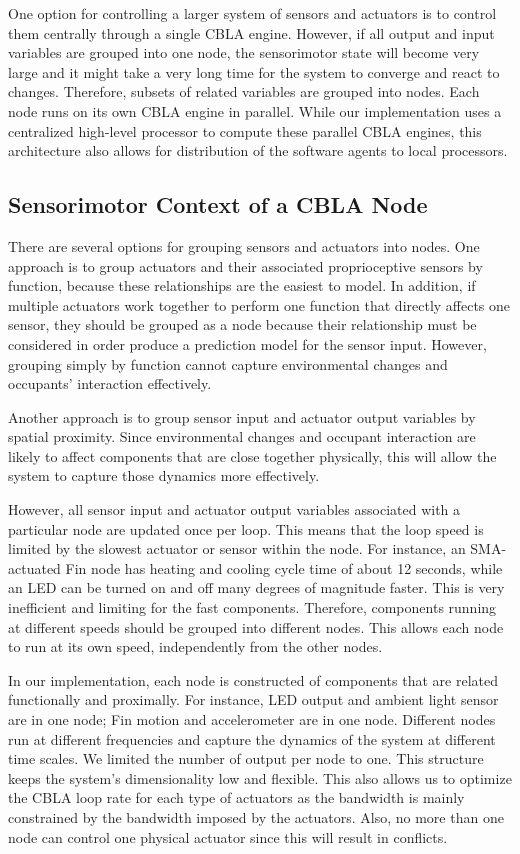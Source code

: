 One option for controlling a larger system of sensors and actuators is to control them centrally through a single CBLA engine.  However, if all output and input variables are grouped into one node, the sensorimotor state will become very large and it might take a very long time for the system to converge and react to changes. Therefore, subsets of related variables are grouped into nodes. Each node runs on its own CBLA engine in parallel.  While our implementation uses a centralized high-level processor to compute these parallel CBLA engines, this architecture also allows for distribution of the software agents to local processors.

\subsection{Sensorimotor Context of a CBLA Node}

There are several options for grouping sensors and actuators into nodes.  One approach is to group actuators and their associated proprioceptive sensors by function, because these relationships are the easiest to model. In addition, if multiple actuators work together to perform one function that directly affects one sensor, they should be grouped as a node because their relationship must be considered in order produce a prediction model for the sensor input. However, grouping simply by function cannot capture environmental changes and occupants' interaction effectively. 

Another approach is to group sensor input and actuator output variables by spatial proximity. Since environmental changes and occupant interaction are likely to affect components that are close together physically, this will allow the system to capture those dynamics more effectively. 

However, all sensor input and actuator output variables associated with a particular node are updated once per loop. This means that the loop speed is limited by the slowest actuator or sensor within the node. For instance, an SMA-actuated Fin node has heating and cooling cycle time of about 12 seconds, while an LED can be turned on and off many degrees of magnitude faster. This is very inefficient and limiting for the fast components. Therefore, components running at different speeds should be grouped into different nodes. This allows each node to run at its own speed, independently from the other nodes. 

In our implementation, each node is constructed of components that are related functionally and proximally. For instance, LED output and ambient light sensor are in one node; Fin motion and accelerometer are in one node. Different nodes run at different frequencies and capture the dynamics of the system at different time scales. We limited the number of output per node to one. This structure keeps the system's dimensionality low and flexible. This also allows us to optimize the CBLA loop rate for each type of actuators as the bandwidth is mainly constrained by the bandwidth imposed by the actuators. Also, no more than one node can control one physical actuator since this will result in conflicts. 

